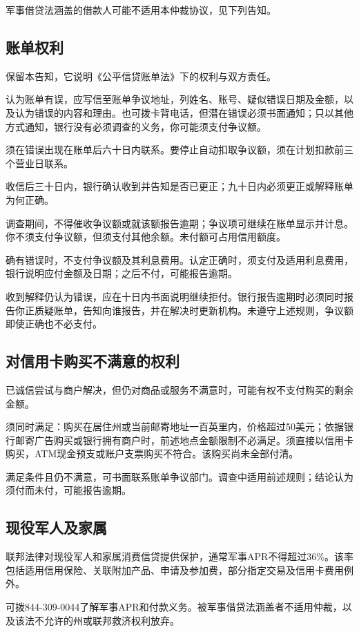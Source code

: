 \documentclass[UTF8,fontset=none,11pt,a4paper]{ctexart}
\begin{document}
军事借贷法涵盖的借款人可能不适用本仲裁协议，见下列告知。


\subsection*{账单权利}
保留本告知，它说明《公平信贷账单法》下的权利与双方责任。


认为账单有误，应写信至账单争议地址，列姓名、账号、疑似错误日期及金额，以及认为错误的内容和理由。也可拨卡背电话，但潜在错误必须书面通知；只以其他方式通知，银行没有必须调查的义务，你可能须支付争议额。


须在错误出现在账单后六十日内联系。要停止自动扣取争议额，须在计划扣款前三个营业日联系。


收信后三十日内，银行确认收到并告知是否已更正；九十日内必须更正或解释账单为何正确。


调查期间，不得催收争议额或就该额报告逾期；争议项可继续在账单显示并计息。你不须支付争议额，但须支付其他余额。未付额可占用信用额度。


确有错误时，不支付争议额及其利息费用。认定正确时，须支付及适用利息费用，银行说明应付金额及日期；之后不付，可能报告逾期。


收到解释仍认为错误，应在十日内书面说明继续拒付。银行报告逾期时必须同时报告你正质疑账单，告知向谁报告，并在解决时更新机构。未遵守上述规则，争议额即使正确也不必支付。


\subsection*{对信用卡购买不满意的权利}
已诚信尝试与商户解决，但仍对商品或服务不满意时，可能有权不支付购买的剩余金额。


须同时满足：购买在居住州或当前邮寄地址一百英里内，价格超过50美元；依据银行邮寄广告购买或银行拥有商户时，前述地点金额限制不必满足。须直接以信用卡购买，ATM现金预支或账户支票购买不符合。该购买尚未全部付清。


满足条件且仍不满意，可书面联系账单争议部门。调查中适用前述规则；结论认为须付而未付，可能报告逾期。


\subsection*{现役军人及家属}
联邦法律对现役军人和家属消费信贷提供保护，通常军事APR不得超过36\%。该率包括适用信用保险、关联附加产品、申请及参加费，部分指定交易及信用卡费用例外。


可拨844-309-0044了解军事APR和付款义务。被军事借贷法涵盖者不适用仲裁，以及该法不允许的州或联邦救济权利放弃。
\end{document}

